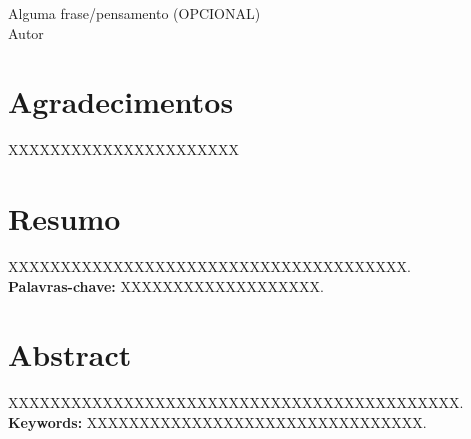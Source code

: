 \documentclass[portuguese,12pt,oneside,a4paper]{book}
\begin{document}
        
        \vspace*{20.0cm}

        \begin{flushright}

             Alguma frase/pensamento (OPCIONAL)\\
             Autor\\
                   

        \end{flushright}



\pagebreak



 

\chapter*{Agradecimentos}


	XXXXXXXXXXXXXXXXXXXXXX


\pagebreak



\chapter*{Resumo}
	XXXXXXXXXXXXXXXXXXXXXXXXXXXXXXXXXXXXXX.\\

\noindent \textbf{Palavras-chave:} XXXXXXXXXXXXXXXXXXX.


\pagebreak



 \chapter*{Abstract}
XXXXXXXXXXXXXXXXXXXXXXXXXXXXXXXXXXXXXXXXXXX.\\

 \noindent \textbf{Keywords:} XXXXXXXXXXXXXXXXXXXXXXXXXXXXXXXX.



\tableofcontents    %


\end{document}
